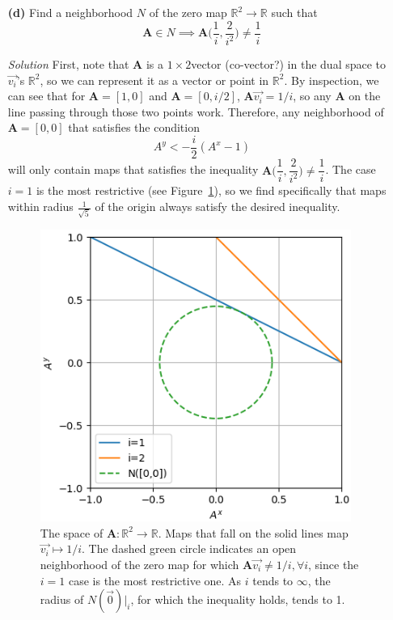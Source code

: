 \documentclass[11pt]{article}
\begin{document}
\begin{itemize}
\item[\textbf{(d)}] Find a neighborhood $N$ of the zero map $\mathbb{R}^2 \to
  \mathbb{R}$ such that
  \[
  \mathbf{A} \in N \implies \mathbf{A}\bigg(\dfrac{1}{i}, \dfrac{2}{i^2}\bigg) \ne \dfrac{1}{i}
  \]
\item[\emph{Solution}] First, note that $\mathbf{A}$ is a $1\times 2$vector
  (co-vector?) in the dual space to $\vec{v_i}$'s $\mathbb{R}^2$, so we can
  represent it as a vector or point in $\mathbb{R}^2$.  By inspection, we can see
  that for $\mathbf{A} = [1,0]$ and $\mathbf{A} = [0,i/2]$,  $\mathbf{A}\vec{v_i} =
  1/i$, so any $\mathbf{A}$ on the line passing through those two points work.
  Therefore, any neighborhood of $\mathbf{A} = [0, 0]$ that satisfies the condition
  \[
  A^y < -\frac{i}{2}(A^x - 1)
  \]
  will only contain maps that satisfies the inequality
  $\mathbf{A}\bigg(\dfrac{1}{i}, \dfrac{2}{i^2}\bigg) \ne \dfrac{1}{i}$.  The case
  $i = 1$ is the most restrictive (see Figure~\ref{fig4}), so we find specifically
  that maps within radius $\frac{1}{\sqrt{5}}$ of the origin always satisfy the desired
  inequality.

  \begin{figure}[h]
    \centerline{\includegraphics[width=4in]{figs/Ex.VII.1.2_fig4.png}}
    \caption{\small{The space of $\mathbf{A}\colon \mathbb{R}^2 \to \mathbb{R}$.
        Maps that fall on the solid lines map $\vec{v_i} \mapsto 1/i$.  The dashed
        green circle indicates an open neighborhood of the zero map for which
        $\mathbf{A}\vec{v_i} \ne 1/i, \forall i$, since the $i=1$ case is the most
        restrictive one. As $i$ tends to $\infty$, the radius of $N(\vec{0})|_i$,
        for which the inequality holds, tends to 1.}}
    \label{fig4}
  \end{figure}


\end{itemize}
\end{document}

